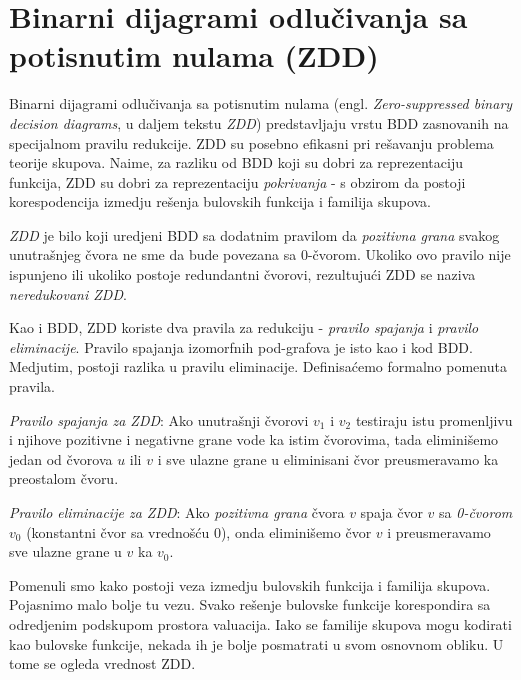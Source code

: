 \section{Binarni dijagrami odlu\v{c}ivanja sa potisnutim nulama (ZDD)}
\label{sec:ZDD}

Binarni dijagrami odlu\v{c}ivanja sa potisnutim nulama (engl. \emph{Zero-suppressed binary decision diagrams}, u daljem tekstu \emph{ZDD}) \cite{ZDD} predstavljaju vrstu BDD zasnovanih na specijalnom pravilu redukcije. ZDD su posebno efikasni pri re\v{s}avanju problema teorije skupova. Naime, za razliku od BDD koji su dobri za reprezentaciju funkcija, ZDD su dobri za reprezentaciju \emph{pokrivanja} - s obzirom da postoji korespodencija izmedju re\v{s}enja bulovskih funkcija i familija skupova.

\begin{defn}
    \emph{ZDD} je bilo koji uredjeni BDD sa dodatnim pravilom da \emph{pozitivna grana} svakog unutra\v{s}njeg \v{c}vora ne sme da bude povezana sa 0-\v{c}vorom. Ukoliko ovo pravilo nije ispunjeno ili ukoliko postoje redundantni \v{c}vorovi, rezultuju\'c{}i ZDD se naziva \emph{neredukovani ZDD}.
\end{defn}

Kao i BDD, ZDD koriste dva pravila za redukciju - \emph{pravilo spajanja} i \emph{pravilo eliminacije}. Pravilo spajanja izomorfnih pod-grafova je isto kao i kod BDD. Medjutim, postoji razlika u pravilu eliminacije. Definisa\'c{}emo formalno pomenuta pravila.

\begin{defn}
    \emph{Pravilo spajanja za ZDD}: Ako unutra\v{s}nji \v{c}vorovi $v_{1}$ i $v_{2}$ testiraju istu promenljivu i njihove pozitivne i negativne grane vode ka istim \v{c}vorovima, tada elimini\v{s}emo jedan od \v{c}vorova $u$ ili $v$ i sve ulazne grane u eliminisani \v{c}vor preusmeravamo ka preostalom \v{c}voru.
\end{defn}

\begin{defn}
    \emph{Pravilo eliminacije za ZDD}: Ako \emph{pozitivna grana} \v{c}vora $v$ spaja \v{c}vor $v$ sa \emph{0-\v{c}vorom} $v_{0}$ (konstantni \v{c}vor sa vredno\v{s}\'c{}u $0$), onda elimini\v{s}emo \v{c}vor $v$ i preusmeravamo sve ulazne grane u $v$ ka $v_{0}$.
\end{defn}

Pomenuli smo kako postoji veza izmedju bulovskih funkcija i familija skupova. Pojasnimo malo bolje tu vezu. Svako re\v{s}enje bulovske funkcije korespondira sa odredjenim podskupom prostora valuacija. Iako se familije skupova mogu kodirati kao bulovske funkcije, nekada ih je bolje posmatrati u svom osnovnom obliku. U tome se ogleda vrednost ZDD.
